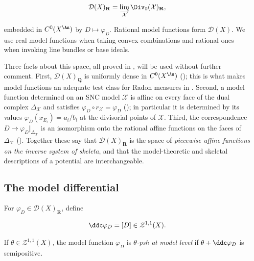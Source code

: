 \begin{equation}
\label{eq:ch20-model-functions}
 \mathcal D(X)_{\mathbf R}
   =\varinjlim_{\mathcal X}\Div_0(\mathcal X)_{\mathbf R},
\end{equation}

embedded in \(C^0(X^{\An})\) by \(D\mapsto\varphi_D\).  Rational model
functions form \(\mathcal D(X)\).  We use real model functions when taking
convex combinations and rational ones when invoking line bundles or base
ideals.

Three facts about this space, all proved in ,
will be used without further comment.  First, \(\mathcal D(X)_{\mathbf Q}\)
is uniformly dense in \(C^0(X^{\An})\)
(); this is what makes model
functions an adequate test class for Radon measures in
.  Second, a model function determined on an SNC model
\(\mathcal X\) is affine on every face of the dual complex
\(\Delta_{\mathcal X}\) and satisfies
\(\varphi_D\circ r_{\mathcal X}=\varphi_D\)
(); in particular it is determined by its
values \(\varphi_D(x_{E_i})=a_i/b_i\) at the divisorial points of
\(\mathcal X\).  Third, the correspondence
\(D\mapsto\varphi_D|_{\Delta_{\mathcal X}}\) is an isomorphism onto the
rational affine functions on the faces of \(\Delta_{\mathcal X}\)
().  Together these say that
\(\mathcal D(X)_{\mathbf R}\) is the space of \emph{piecewise affine
functions on the inverse system of skeleta}, and that the model-theoretic
and skeletal descriptions of a potential are interchangeable.

\subsection{The model differential}
\label{sec:ch20-ddc-definition}

\begin{definition}
\label{def:ch20-ddc}
For \(\varphi_D\in\mathcal D(X)_{\mathbf R}\), define

\begin{equation}
\label{eq:ch20-ddc}
                         \ddc\varphi_D=[D]
                         \in\mathcal Z^{1,1}(X).
\end{equation}

If \(\theta\in\mathcal Z^{1,1}(X)\), the model function \(\varphi_D\) is
\emph{\(\theta\)-psh at model level} if
\(\theta+\ddc\varphi_D\) is semipositive.
\end{definition}

